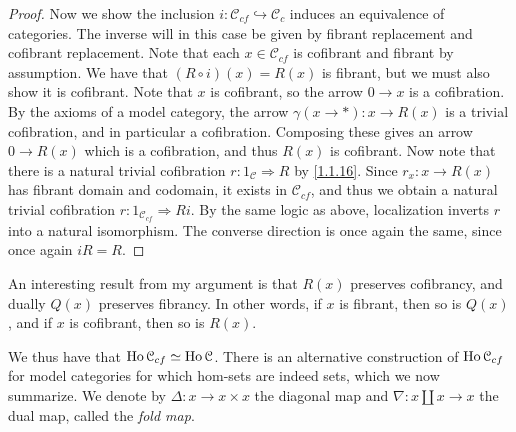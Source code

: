 \begin{proof}
	Now we show the inclusion $i : \mathcal{C} _{cf} \hookrightarrow \mathcal{C} _c$ induces an equivalence of categories. The inverse will in this case be given by fibrant replacement and cofibrant replacement. Note that each $x\in \mathcal{C} _{cf} $ is cofibrant and fibrant by assumption. We have that $(R\circ i)(x)=R(x)$ is fibrant, but we must also show it is cofibrant. Note that $x$ is cofibrant, so the arrow $0\to x$ is a cofibration. By the axioms of a model category, the arrow $\gamma(x\to *): x \to R(x)$ is a trivial cofibration, and in particular a cofibration. Composing these gives an arrow $0\to R(x)$ which is a cofibration, and thus $R(x)$ is cofibrant. Now note that there is a natural trivial cofibration $r : 1_\mathcal{C}  \Rightarrow R$ by \cref{1.1.16}. Since $r_x : x \to R(x)$ has fibrant domain and codomain, it exists in $\mathcal{C} _{cf} $, and thus we obtain a natural trivial cofibration $r : 1_{\mathcal{C} _{cf} }  \Rightarrow Ri$. By the same logic as above, localization inverts $r$ into a natural isomorphism. The converse direction is once again the same, since once again $iR=R$.
\end{proof}

\begin{remark}\label{1.2.7}
	An interesting result from my argument is that $R(x)$ preserves cofibrancy, and dually $Q(x)$ preserves fibrancy. In other words, if $x$ is fibrant, then so is $Q(x)$, and if $x$ is cofibrant, then so is $R(x)$.
\end{remark}

We thus have that $\operatorname{Ho} \mathcal{C}_{cf} \simeq \operatorname{Ho} \mathcal{C} $. There is an alternative construction of $\operatorname{Ho} \mathcal{C} _{cf} $ for model categories for which hom-sets are indeed sets, which we now summarize. We denote by $\Delta : x \to x\times x$ the diagonal map and $\nabla : x\amalg x \to x$ the dual map, called the \emph{fold map}.

